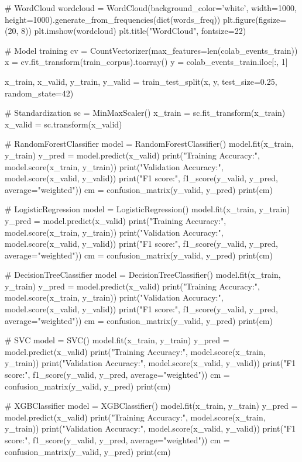 \begin{codigo}[caption={Modelo de classificação supervisionada de sentimentos}, label={codigo:sentiment_classifier}, language=Python, breaklines=true]
  # WordCloud
  wordcloud = WordCloud(background_color='white', width=1000, height=1000).generate_from_frequencies(dict(words_freq))
  plt.figure(figsize=(20, 8))
  plt.imshow(wordcloud)
  plt.title("WordCloud", fontsize=22)
  
  # Model training
  cv = CountVectorizer(max_features=len(colab_events_train))
  x = cv.fit_transform(train_corpus).toarray()
  y = colab_events_train.iloc[:, 1]
  
  x_train, x_valid, y_train, y_valid = train_test_split(x, y, test_size=0.25, random_state=42)
  
  # Standardization
  sc = MinMaxScaler()
  x_train = sc.fit_transform(x_train)
  x_valid = sc.transform(x_valid)
  
  # RandomForestClassifier
  model = RandomForestClassifier()
  model.fit(x_train, y_train)
  y_pred = model.predict(x_valid)
  print("Training Accuracy:", model.score(x_train, y_train))
  print("Validation Accuracy:", model.score(x_valid, y_valid))
  print("F1 score:", f1_score(y_valid, y_pred, average="weighted"))
  cm = confusion_matrix(y_valid, y_pred)
  print(cm)
  
  # LogisticRegression
  model = LogisticRegression()
  model.fit(x_train, y_train)
  y_pred = model.predict(x_valid)
  print("Training Accuracy:", model.score(x_train, y_train))
  print("Validation Accuracy:", model.score(x_valid, y_valid))
  print("F1 score:", f1_score(y_valid, y_pred, average="weighted"))
  cm = confusion_matrix(y_valid, y_pred)
  print(cm)
  
  # DecisionTreeClassifier
  model = DecisionTreeClassifier()
  model.fit(x_train, y_train)
  y_pred = model.predict(x_valid)
  print("Training Accuracy:", model.score(x_train, y_train))
  print("Validation Accuracy:", model.score(x_valid, y_valid))
  print("F1 score:", f1_score(y_valid, y_pred, average="weighted"))
  cm = confusion_matrix(y_valid, y_pred)
  print(cm)
  
  # SVC
  model = SVC()
  model.fit(x_train, y_train)
  y_pred = model.predict(x_valid)
  print("Training Accuracy:", model.score(x_train, y_train))
  print("Validation Accuracy:", model.score(x_valid, y_valid))
  print("F1 score:", f1_score(y_valid, y_pred, average="weighted"))
  cm = confusion_matrix(y_valid, y_pred)
  print(cm)
  
  # XGBClassifier
  model = XGBClassifier()
  model.fit(x_train, y_train)
  y_pred = model.predict(x_valid)
  print("Training Accuracy:", model.score(x_train, y_train))
  print("Validation Accuracy:", model.score(x_valid, y_valid))
  print("F1 score:", f1_score(y_valid, y_pred, average="weighted"))
  cm = confusion_matrix(y_valid, y_pred)
  print(cm)
\end{codigo}